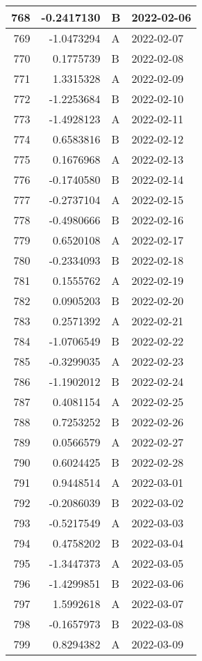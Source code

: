 \begin{tabular}{r|r|l|l}
\hline
768 & -0.2417130 & B & 2022-02-06\\
\hline
769 & -1.0473294 & A & 2022-02-07\\
\hline
770 & 0.1775739 & B & 2022-02-08\\
\hline
771 & 1.3315328 & A & 2022-02-09\\
\hline
772 & -1.2253684 & B & 2022-02-10\\
\hline
773 & -1.4928123 & A & 2022-02-11\\
\hline
774 & 0.6583816 & B & 2022-02-12\\
\hline
775 & 0.1676968 & A & 2022-02-13\\
\hline
776 & -0.1740580 & B & 2022-02-14\\
\hline
777 & -0.2737104 & A & 2022-02-15\\
\hline
778 & -0.4980666 & B & 2022-02-16\\
\hline
779 & 0.6520108 & A & 2022-02-17\\
\hline
780 & -0.2334093 & B & 2022-02-18\\
\hline
781 & 0.1555762 & A & 2022-02-19\\
\hline
782 & 0.0905203 & B & 2022-02-20\\
\hline
783 & 0.2571392 & A & 2022-02-21\\
\hline
784 & -1.0706549 & B & 2022-02-22\\
\hline
785 & -0.3299035 & A & 2022-02-23\\
\hline
786 & -1.1902012 & B & 2022-02-24\\
\hline
787 & 0.4081154 & A & 2022-02-25\\
\hline
788 & 0.7253252 & B & 2022-02-26\\
\hline
789 & 0.0566579 & A & 2022-02-27\\
\hline
790 & 0.6024425 & B & 2022-02-28\\
\hline
791 & 0.9448514 & A & 2022-03-01\\
\hline
792 & -0.2086039 & B & 2022-03-02\\
\hline
793 & -0.5217549 & A & 2022-03-03\\
\hline
794 & 0.4758202 & B & 2022-03-04\\
\hline
795 & -1.3447373 & A & 2022-03-05\\
\hline
796 & -1.4299851 & B & 2022-03-06\\
\hline
797 & 1.5992618 & A & 2022-03-07\\
\hline
798 & -0.1657973 & B & 2022-03-08\\
\hline
799 & 0.8294382 & A & 2022-03-09\\

\end{tabular}
